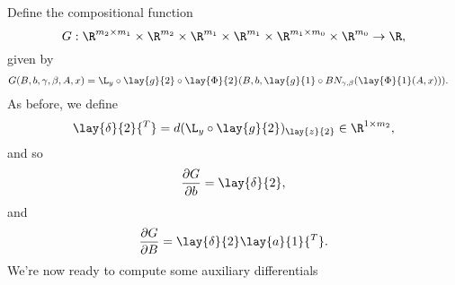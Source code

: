 Define the compositional function
$$G:\R^{m_2\times m_1}\times\R^{m_2}\times\R^{m_1}\times\R^{m_1}\times\R^{m_1\times m_0}\times\R^{m_0}\to\R,$$
given by
\begin{align*}
	G(B,b,\gamma,\beta,A,x)&=\L_y\circ\lay{g}{2}\circ\lay{\Phi}{2}(B,b,\lay{g}{1}\circ BN_{\gamma,\beta}(\lay{\Phi}{1}(A,x))).
\end{align*}
As before, we define
$$\lay{\delta}{2}{^T}=d(\L_y\circ\lay{g}{2})_{\lay{z}{2}}\in\R^{1\times m_2},$$
and so
$$\frac{\partial G}{\partial b}=\lay{\delta}{2},$$
and
$$\frac{\partial G}{\partial B}=\lay{\delta}{2}\lay{a}{1}{^T}.$$
We're now ready to compute some auxiliary differentials





